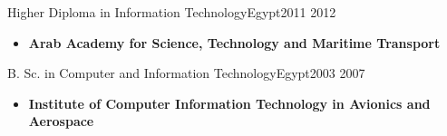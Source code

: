 %
%
%



\begin{experiences}
    \experience
    {}   {Higher Diploma in Information Technology}{Egypt}{2011}
    {2012} {
            \begin{itemize}
                \item \textbf{Arab Academy for Science, Technology and Maritime Transport}
            \end{itemize}
        }{}
    \emptySeparator
    \experience
    {}   {B. Sc. in Computer and Information Technology}{Egypt}{2003}
    {2007} {
            \begin{itemize}
                \item \textbf{Institute of Computer Information Technology in Avionics and Aerospace}
            \end{itemize}
        }{}
\end{experiences}